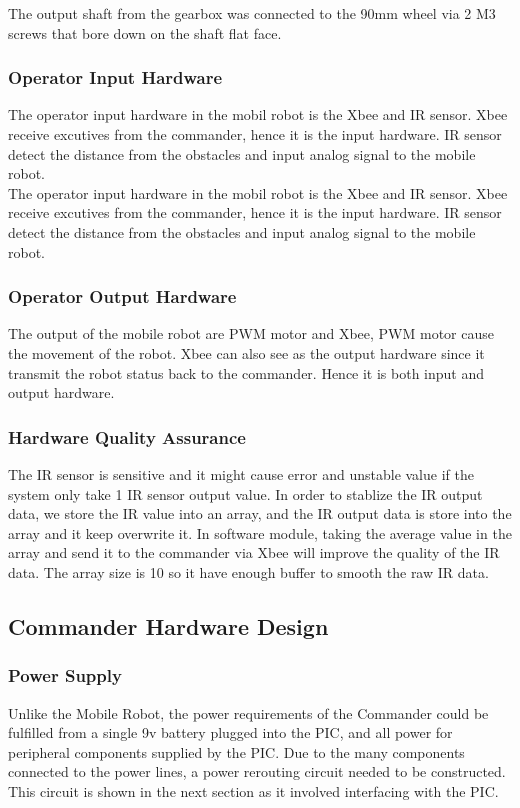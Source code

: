 \documentclass[11pt,a4paper]{article}
\begin{document}
     
     
      The output shaft from the gearbox was connected to the 90mm wheel via 2 M3 screws that bore down on the shaft flat face. 
    \subsubsection{Operator Input Hardware}
  The operator input hardware in the mobil robot is the Xbee and IR sensor. Xbee receive excutives from the commander, hence it is the input hardware. IR sensor detect the distance from the obstacles and input analog signal to the mobile robot.\\
    The operator input hardware in the mobil robot is the Xbee and IR sensor. Xbee receive excutives from the commander, hence it is the input hardware. IR sensor detect the distance from the obstacles and input analog signal to the mobile robot.  
    \subsubsection{Operator Output Hardware}
    The output of the mobile robot are PWM motor and Xbee, PWM motor cause the movement of the robot. Xbee can also see as the output hardware since it transmit the robot status back to the commander. Hence it is both input and output hardware.
    \subsubsection{Hardware Quality Assurance}
    The IR sensor is sensitive and it might cause error and unstable value if the system only take 1 IR sensor output value. In order to stablize the IR output data, we store the IR value into an array, and the IR output data is store into the array and it keep overwrite it. In software module, taking the average value in the array and send it to the commander via Xbee will improve the quality of the IR data. The array size is 10 so it have enough buffer to smooth the raw IR data.\\

   
  \subsection{Commander Hardware Design}
    \subsubsection{Power Supply}
      Unlike the Mobile Robot, the power requirements of the Commander could be fulfilled from a single 9v battery plugged into the PIC, and all power for peripheral components supplied by the PIC. Due to the many components connected to the power lines, a power rerouting circuit needed to be constructed. This circuit is shown in the next section as it involved interfacing with the PIC.
\end{document}
